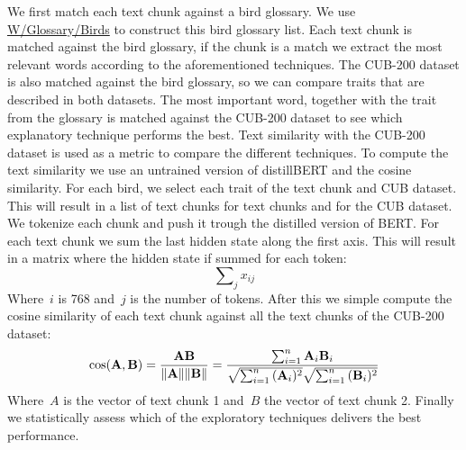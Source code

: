 \documentclass[a4paper, 12pt, oneside]{book} %
\begin{document}
We first match each text chunk against a bird glossary.
We use \href{https://en.wikipedia.org/wiki/Glossary_of_bird_terms}{W/Glossary/Birds} to construct this bird glossary list.
Each text chunk is matched against the bird glossary, if the chunk is a match we extract the most relevant words according to the aforementioned techniques.
The CUB-200 dataset is also matched against the bird glossary, so we can compare traits that are described in both datasets.
The most important word, together with the trait from the glossary is matched against the CUB-200 dataset to see which explanatory technique performs the best.
Text similarity with the CUB-200 dataset is used as a metric to compare the different techniques.
To compute the text similarity we use an untrained version of distillBERT and the cosine similarity.
For each bird, we select each trait of the text chunk and CUB dataset.
This will result in a list of text chunks for text chunks and for the CUB dataset.
We tokenize each chunk and push it trough the distilled version of BERT.
For each text chunk we sum the last hidden state along the first axis.
This will result in a matrix where the hidden state if summed for each token:
\begin{equation}
     \sum\nolimits_{j}^{} x_{ij} 
\end{equation}
Where~$i$ is 768 and~$j$ is the number of tokens. 
After this we simple compute the cosine similarity of each text chunk against all the text chunks of the CUB-200 dataset:
\begin{equation}
\cos ({\bf A},{\bf B})= {{\bf A} {\bf B} \over \|{\bf A}\| \|{\bf B}\|} = \frac{ \sum_{i=1}^{n}{{\bf A}_i{\bf B}_i} }{ \sqrt{\sum_{i=1}^{n}{({\bf A}_i)^2}} \sqrt{\sum_{i=1}^{n}{({\bf B}_i)^2}} }
\end{equation}
Where~$A$ is the vector of text chunk 1 and~$B$ the vector of text chunk 2.
Finally we statistically assess which of the exploratory techniques delivers the best performance.
\end{document}
